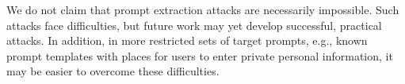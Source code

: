 We do not claim that prompt extraction attacks are necessarily impossible. Such attacks face difficulties, but future work may yet develop successful, practical attacks. In addition, in more restricted sets of target prompts, e.g., known prompt templates with places for users to enter private personal information, it may be easier to overcome these difficulties.


